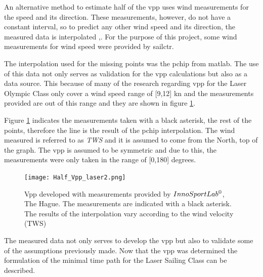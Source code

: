An alternative method to estimate half of the  \acrshort{vpp} uses wind measurements for the speed and its direction. These measurements, however, do not have a constant interval, so to predict any other wind speed and its direction, the measured data is interpolated  
\cite{philpott2001optimising},\cite{allsopp2000optimal}. For the purpose of this project, some wind measurements for wind speed  were provided by \acrlong{sailctr}. \par \noindent 
The interpolation used for the missing points was the \acrfull{pchip} from \acrshort{matlab}. The use of this data not only serves as validation for the \acrshort{vpp} calculations but also as a data source. This because of many of the research regarding \acrshort{vpp} for the Laser Olympic Class only cover a wind speed range of [9,12] kn \cite{day2017performance} and the measurements provided are out of this range and they are shown in figure \ref{fig:hvpp_MeasData}.\par \noindent
Figure \ref{fig:hvpp_MeasData} indicates the measurements taken with a black asterisk, the rest of the points, therefore the line is the result of the \acrshort{pchip} interpolation. The wind measured is referred to as \textit{TWS} and it is assumed to come from the North, top of the graph. The \acrshort{vpp} is assumed to be symmetric and due to this, the measurements were only taken in the range of [0,180] degrees. \par 
\begin{figure} [hbt!]
    \centering
    \texttt{[image: Half\_Vpp\_laser2.png]}
    \caption{Vpp developed with measurements provided by $InnoSportLab\textsuperscript {\textregistered}$, The Hague. The measurements are indicated with a black asterisk. The results of the interpolation vary according to the wind velocity (TWS)}
    \label{fig:hvpp_MeasData}
\end{figure}
The measured data not only serves to develop the \acrshort{vpp} but also to validate some of the assumptions previously made. Now that the \acrshort{vpp} was determined the formulation of the minimal time path for the Laser Sailing Class can be described.  \par 

